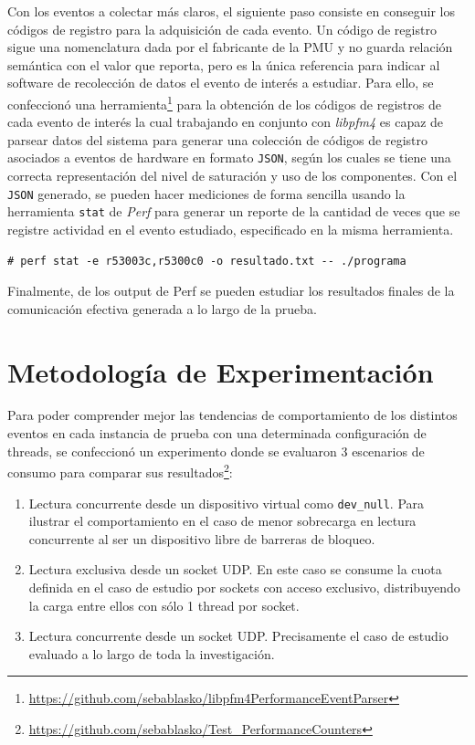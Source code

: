 Con los eventos a colectar más claros, el siguiente paso consiste en conseguir los códigos de registro para la adquisición de cada evento. Un código de registro sigue una nomenclatura dada por el fabricante de la PMU y no guarda relación semántica con el valor que reporta, pero es la única referencia para indicar al software de recolección de datos el evento de interés a estudiar. Para ello, se confeccionó una herramienta\footnote{\url{https://github.com/sebablasko/libpfm4PerformanceEventParser}} para la obtención de los códigos de registros de cada evento de interés la cual trabajando en conjunto con \emph{libpfm4} es capaz de parsear datos del sistema para generar una colección de códigos de registro asociados a eventos de hardware en formato \verb=JSON=, según los cuales se tiene una correcta representación del nivel de saturación y uso de los componentes. Con el \verb=JSON= generado, se pueden hacer mediciones de forma sencilla usando la herramienta \verb=stat= de \emph{Perf} para generar un reporte de la cantidad de veces que se registre actividad en el evento estudiado, especificado en la misma herramienta.

\vspace{1pc}
\begin{lstlisting}[style=BashInputStyle, breaklines=true, captionpos=b, caption={Ejemplo de uso de Perf para colectar datos de una colección de eventos. En este caso se configura para colectar datos de 2 eventos y dejar el reporte en un archivo de salida.}]
	# perf stat -e r53003c,r5300c0 -o resultado.txt -- ./programa
\end{lstlisting}

Finalmente, de los output de Perf se pueden estudiar los resultados finales de la comunicación efectiva generada a lo largo de la prueba.

\section{Metodología de Experimentación}
Para poder comprender mejor las tendencias de comportamiento de los distintos eventos en cada instancia de prueba con una determinada configuración de threads, se confeccionó un experimento donde se evaluaron 3 escenarios de consumo para comparar sus resultados\footnote{\url{https://github.com/sebablasko/Test_PerformanceCounters}}:

\begin{enumerate}
\item Lectura concurrente desde un dispositivo virtual como \verb=dev_null=. Para ilustrar el comportamiento en el caso de menor sobrecarga en lectura concurrente al ser un dispositivo libre de barreras de bloqueo.
\item Lectura exclusiva desde un socket UDP. En este caso se consume la cuota definida en el caso de estudio por sockets con acceso exclusivo, distribuyendo la carga entre ellos con sólo 1 thread por socket. 
\item Lectura concurrente desde un socket UDP. Precisamente el caso de estudio evaluado a lo largo de toda la investigación.
\end{enumerate}

